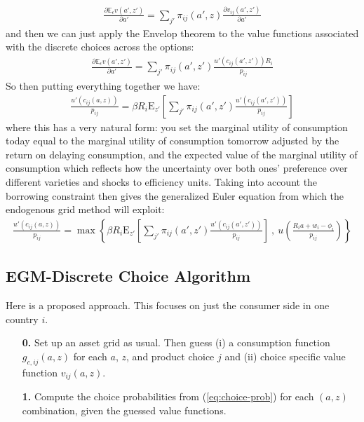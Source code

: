 \documentclass[12pt,pdftex]{article}
\begin{document}
\begin{onehalfspacing}
\begin{align}
\frac{\partial \mathbb{E}_{\epsilon} v(a', z')}{\partial a'} = \sum_{j'} \pi_{ij}(a', z) \frac{\partial v_{ij}(a', z')}{\partial a'}
\end{align}
and then we can just apply the Envelop theorem to the value functions associated with the discrete choices across the options:
\begin{align}
\frac{\partial \mathbb{E}_{\epsilon} v(a', z')}{\partial a'} = \sum_{j'} \pi_{ij}(a', z') \frac{u'(c_{ij}(a', z'))R_{i}}{p_{ij}}
\end{align}
So then putting everything together we have:
\begin{align}
\frac{u'(c_{ij}(a, z))}{p_{ij}} = \beta R_{i} \mathrm{E}_{z'} \left[ \sum_{j'} \pi_{ij}(a', z') \frac{u'(c_{ij}(a', z'))}{p_{ij}} \right]
\end{align}
where this has a very natural form: you set the marginal utility of consumption today equal to the marginal utility of consumption tomorrow adjusted by the return on delaying consumption, and the expected value of the marginal utility of consumption which reflects how the uncertainty over both ones' preference over different varieties and shocks to efficiency units. Taking into account the borrowing constraint then gives the generalized Euler equation from which the endogenous grid method will exploit:
\begin{align}
\frac{u'(c_{ij}(a, z))}{p_{ij}} = \max \left\{ \beta R_{i} \mathrm{E}_{z'} \left[ \sum_{j'} \pi_{ij}(a', z') \frac{u'(c_{ij}(a', z'))}{p_{ij}} \right] \ , \  u \left( \frac{R_i a + w_i - \phi_{i}}{p_{ij}} \right) \right \}
\label{eq:euler_equation}
\end{align}

\subsection{EGM-Discrete Choice Algorithm}

Here is a proposed approach. This focuses on just the consumer side in one country $i$.
\begin{itemize}
\item[\textbf{0.}] Set up an asset grid as usual. Then guess (i) a consumption function $g_{c,ij}(a,z)$ for each $a$, $z$, and product choice $j$ and (ii) choice specific value function $v_{ij}(a,z)$.

\item[\textbf{1.}] Compute the choice probabilities from (\ref{eq:choice-prob}) for each $(a,z)$ combination, given the guessed value functions.


\end{itemize}
\end{onehalfspacing}
\end{document}
